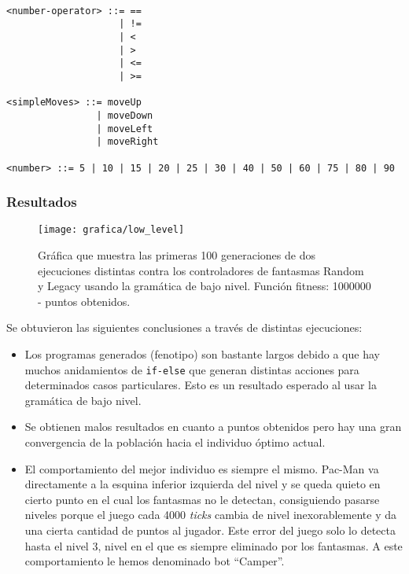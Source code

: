 \begin{lstlisting}[frame=single, breaklines=no, basicstyle=\fontsize{10}{11}\ttfamily, caption={Gramática de bajo nivel.}, captionpos=b]
 
<number-operator> ::= ==
                    | !=
                    | <
                    | >
                    | <=
                    | >=
 
<simpleMoves> ::= moveUp
                | moveDown
                | moveLeft
                | moveRight
 
<number> ::= 5 | 10 | 15 | 20 | 25 | 30 | 40 | 50 | 60 | 75 | 80 | 90
\end{lstlisting}

\subsubsection{Resultados}
\begin{figure}[H]
\centering
\texttt{[image: grafica/low\_level]}
\caption{Gráfica que muestra las primeras 100 generaciones de dos ejecuciones distintas contra los controladores de fantasmas Random y Legacy usando la gramática de bajo nivel. Función fitness: 1000000 - puntos obtenidos.}
\end{figure}

Se obtuvieron las siguientes conclusiones a través de distintas ejecuciones:
\begin{itemize}
\item Los programas generados (fenotipo) son bastante largos debido a que hay muchos anidamientos de \texttt{if-else} que generan distintas acciones para determinados casos particulares. Esto es un resultado esperado al usar la gramática de bajo nivel.

\item Se obtienen malos resultados en cuanto a puntos obtenidos pero hay una gran convergencia de la población hacia el individuo óptimo actual.

\item El comportamiento del mejor individuo es siempre el mismo. Pac-Man va directamente a la esquina inferior izquierda del nivel y se queda quieto en cierto punto en el cual los fantasmas no le detectan, consiguiendo pasarse niveles porque el juego cada 4000 \textit{ticks} cambia de nivel inexorablemente y da una cierta cantidad de puntos al jugador. Este error del juego solo lo detecta hasta el nivel 3, nivel en el que es siempre eliminado por los fantasmas. A este comportamiento le hemos denominado bot ``Camper''.
\end{itemize}

